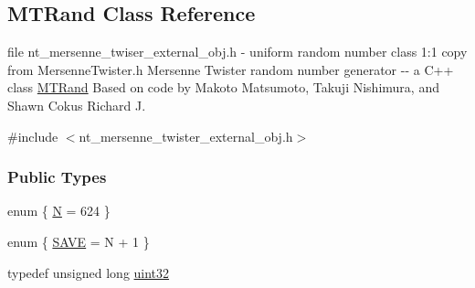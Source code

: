 \subsection{MTRand Class Reference}
\label{class_m_t_rand}


file nt\_\-mersenne\_\-twiser\_\-external\_\-obj.h -\/ uniform random number class 1:1 copy from MersenneTwister.h Mersenne Twister random number generator -\/-\/ a C++ class \hyperlink{class_m_t_rand}{MTRand} Based on code by Makoto Matsumoto, Takuji Nishimura, and Shawn Cokus Richard J.  




{\ttfamily \#include $<$nt\_\-mersenne\_\-twister\_\-external\_\-obj.h$>$}

\subsubsection*{Public Types}
\begin{DoxyCompactItemize}
\item 
enum \{ \hyperlink{class_m_t_rand_ab8fea37d16b55e1a0fe06149e325f1b6a60f472facea8fabd42765cd91273db7b}{N} =  624
 \}
\item 
enum \{ \hyperlink{class_m_t_rand_a7d9f4f1783a4e45f7834dd5174dfc2a1a3899803ea0d4da3018d311ed4902d9cc}{SAVE} =  N + 1
 \}
\item 
typedef unsigned long \hyperlink{class_m_t_rand_a45478edf9e24dcd2a5164bac3889d6a2}{uint32}
\end{DoxyCompactItemize}
